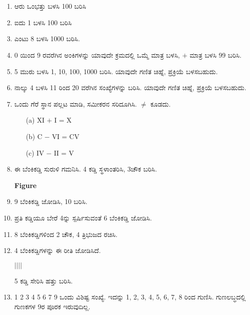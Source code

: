 \chapter{}\label{chap12}

\begin{enumerate}
\renewcommand{\labelenumi}{\bf\theenumi.}
\itemsep=5pt

\item ಆರು ಒಂಭತ್ತು ಬಳಸಿ 100 ಬರಿಸಿ 

\item ಐದು 1 ಬಳಸಿ 100 ಬರಿಸಿ

\item ಎಂಟು 8 ಬಳಸಿ 1000 ಬರಿಸಿ. 

\item 0 ಯಿಂದ 9 ರವರೆಗಿನ ಅಂಕಿಗಳನ್ನು ಯಾವುದೇ ಕ್ರಮದಲ್ಲಿ ಒಮ್ಮೆ ಮಾತ್ರ ಬಳಸಿ, $+$ ಮಾತ್ರ ಬಳಸಿ 99 ಬರಿಸಿ. 

\item 5 ಮುರು ಬಳಸಿ 1, 10, 100, 1000 ಬರಿಸಿ. ಯಾವುದೇ ಗಣಿತ ಚಿಹ್ನೆ, ಪ್ರಕ್ರಿಯೆ ಬಳಸಬಹುದು. 

\item ನಾಲ್ಕು 4 ಬಳಸಿ 11 ರಿಂದ 20 ವರೆಗಿನ ಸಂಖ್ಯೆಗಳನ್ನು ಬರಿಸಿ. ಯಾವುದೇ ಗಣಿತ ಚಿಹ್ನೆ, ಪ್ರಕ್ರಿಯೆ ಬಳಸಬಹುದು. 

\item ಒಂದು ಗೆರೆ ಸ್ಥಾನ ಪಲ್ಲಟ ಮಾಡಿ, ಸಮೀಕರನ ಸರಿದೂಗಿಸಿ. $\neq$ ಕೂಡದು. 
\begin{itemize}
\item[(a)] XI $+$ I = X
\item[(b)] C $-$ VI = CV
\item[(c)] IV $-$ II = V
\end{itemize}

\item ಈ ಬೆಂಕಿಕಡ್ಡಿ ಸುರುಳಿ ಗಮನಿಸಿ. 4 ಕಡ್ಡಿ ಸ್ಥಳಾಂತರಿಸಿ, 3ಚೌಕ ಬರಿಸಿ. 
\begin{center}
{\bf Figure}
\end{center}

\item 9 ಬೆಂಕಿಕಡ್ಡಿ ಜೋಡಿಸಿ, 10 ಬರಿಸಿ. 

\item ಪ್ರತಿ ಕಡ್ಡಿಯೂ ಬೇರೆ 4ನ್ನು ಸ್ಪರ್ಷಿಸುವಂತೆ 6 ಬೆಂಕಿಕಡ್ಡಿ ಜೋಡಿಸಿ. 

\item 8 ಬೆಂಕಿಕಡ್ಡಿಗಳಿಂದ 2 ಚೌಕ, 4 ತ್ರಿಭುಜದ ರಚಿಸಿ.

\item 4 ಬೆಂಕಿಕಡ್ಡಿಗಳನ್ನು ಈ ರೀತಿ ಜೋಡಿಸಿದೆ. 

$| | | |$

5 ಕಡ್ಡಿ ಸೇರಿಸಿ ಹತ್ತು ಬರಿಸಿ. 

\item 1 2 3 4 5 6 7 9 ಒಂದು ವಿಶಿಷ್ಟ ಸಂಖ್ಯೆ. ಇದನ್ನು 1, 2, 3, 4, 5, 6, 7, 8 ರಿಂದ ಗುಣಿಸಿ. ಗುಣಲಬ್ಧದಲ್ಲಿ ಗುಣಕಗಳ 9ರ ಪೂರಕ ಇರುವುದಿಲ್ಲ. 


\end{enumerate}
